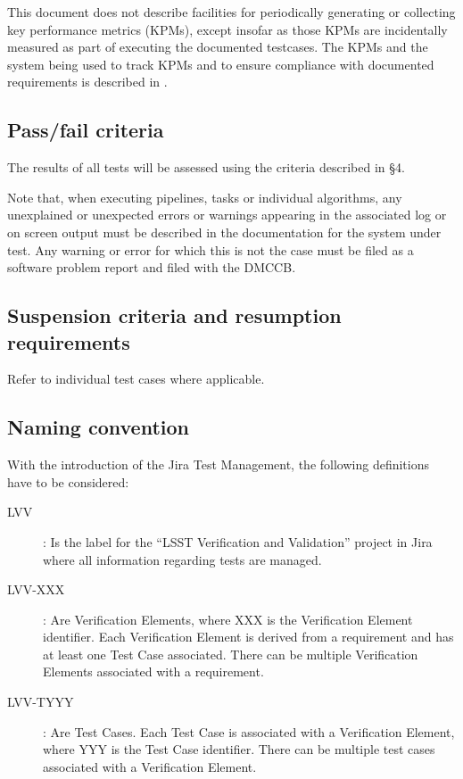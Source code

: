 \documentclass[DM,lsstdraft,STS,toc]{lsstdoc}
\begin{document}
This document does not describe facilities for periodically generating or
collecting key performance metrics (KPMs), except insofar as those KPMs are
incidentally measured as part of executing the documented testcases. The KPMs
and the system being used to track KPMs and to ensure compliance with
documented requirements is described in .

\subsection{Pass/fail criteria}
\label{sec:passfail}

The results of all tests will be assessed using the criteria described in
 \S4.

Note that, when executing pipelines, tasks or individual algorithms, any
unexplained or unexpected errors or warnings appearing in the associated log
or on screen output must be described in the documentation for the system
under test. Any warning or error for which this is not the case must be filed
as a software problem report and filed with the DMCCB.

\subsection{Suspension criteria and resumption requirements}
\label{suspension}

Refer to individual test cases where applicable.

\subsection{Naming convention}

With the introduction of the Jira Test Management, the following definitions have to be considered:

\begin{description}
  \item[LVV]{: Is the label for the ``LSST Verification and Validation'' project in Jira where all information regarding tests are managed.}
  \item[LVV-XXX]{: Are Verification Elements, where XXX is the Verification Element identifier.  Each Verification Element is derived from a requirement and has at least one Test Case associated. There can be multiple Verification Elements associated with a requirement.}
  \item[LVV-TYYY]{: Are Test Cases. Each Test Case is associated with a Verification Element, where YYY is the Test Case identifier. There can be multiple test cases associated with a Verification Element.}
\end{description}
\end{document}
